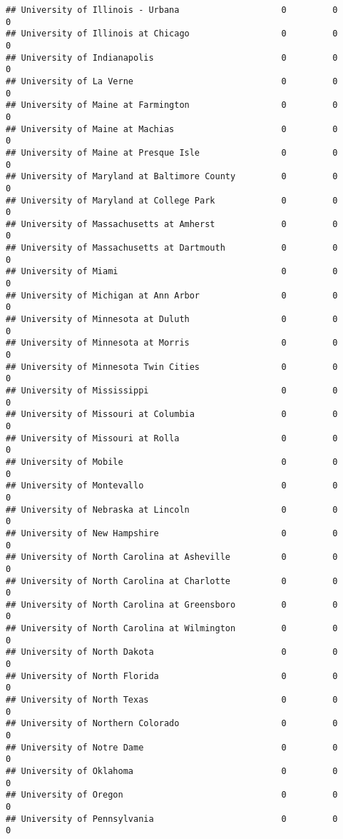 \documentclass[
]{article}
\begin{document}
\begin{verbatim}
## University of Illinois - Urbana                    0         0         0
## University of Illinois at Chicago                  0         0         0
## University of Indianapolis                         0         0         0
## University of La Verne                             0         0         0
## University of Maine at Farmington                  0         0         0
## University of Maine at Machias                     0         0         0
## University of Maine at Presque Isle                0         0         0
## University of Maryland at Baltimore County         0         0         0
## University of Maryland at College Park             0         0         0
## University of Massachusetts at Amherst             0         0         0
## University of Massachusetts at Dartmouth           0         0         0
## University of Miami                                0         0         0
## University of Michigan at Ann Arbor                0         0         0
## University of Minnesota at Duluth                  0         0         0
## University of Minnesota at Morris                  0         0         0
## University of Minnesota Twin Cities                0         0         0
## University of Mississippi                          0         0         0
## University of Missouri at Columbia                 0         0         0
## University of Missouri at Rolla                    0         0         0
## University of Mobile                               0         0         0
## University of Montevallo                           0         0         0
## University of Nebraska at Lincoln                  0         0         0
## University of New Hampshire                        0         0         0
## University of North Carolina at Asheville          0         0         0
## University of North Carolina at Charlotte          0         0         0
## University of North Carolina at Greensboro         0         0         0
## University of North Carolina at Wilmington         0         0         0
## University of North Dakota                         0         0         0
## University of North Florida                        0         0         0
## University of North Texas                          0         0         0
## University of Northern Colorado                    0         0         0
## University of Notre Dame                           0         0         0
## University of Oklahoma                             0         0         0
## University of Oregon                               0         0         0
## University of Pennsylvania                         0         0         0

\end{verbatim}
\end{document}
